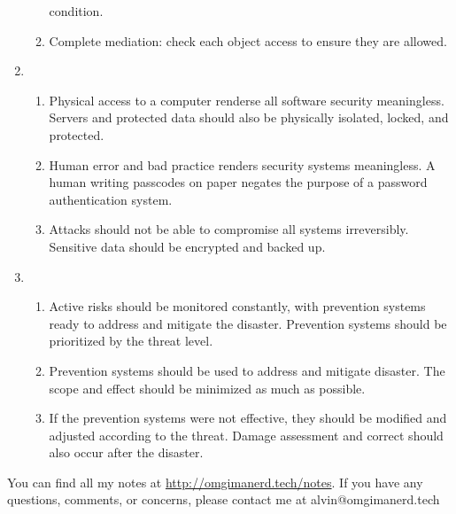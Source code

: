\documentclass{math}
\begin{document}
\begin{enumerate}
\begin{enumerate}
    condition.
    \item Complete mediation: check each object access to ensure they are
    allowed.
  \end{enumerate}
  \item \begin{enumerate}
    \item Physical access to a computer renderse all software security
    meaningless. Servers and protected data should also be physically isolated,
    locked, and protected.
    \item Human error and bad practice renders security systems meaningless.
    A human writing passcodes on paper negates the purpose of a password
    authentication system.
    \item Attacks should not be able to compromise all systems irreversibly.
    Sensitive data should be encrypted and backed up.
  \end{enumerate}
  \item \begin{enumerate}
    \item Active risks should be monitored constantly, with prevention systems
    ready to address and mitigate the disaster. Prevention systems should be
    prioritized by the threat level.
    \item Prevention systems should be used to address and mitigate
    disaster. The scope and effect should be minimized as much as possible.
    \item If the prevention systems were not effective, they should be modified
    and adjusted according to the threat. Damage assessment and correct should
    also occur after the disaster.
  \end{enumerate}
\end{enumerate}

\begin{center}
  You can find all my notes at \url{http://omgimanerd.tech/notes}. If you have
  any questions, comments, or concerns, please contact me at
  alvin@omgimanerd.tech
\end{center}
\end{document}
